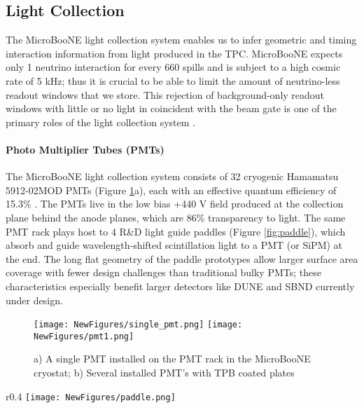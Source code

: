 \documentclass[12pt]{article}
\begin{document}
\subsection{Light Collection} \label{subsec:lightCollection}
\par The MicroBooNE light collection system enables us to infer geometric and timing interaction information from light produced in the TPC. MicroBooNE expects only 1 neutrino interaction for every 660 spills \cite{bib:first_nus} and is subject to a high cosmic rate of 5 kHz; thus it is crucial to be able to limit the amount of neutrino-less readout windows that we store. This rejection of background-only readout windows with little or no light in coincident with the beam gate is one of the primary roles of the light collection system \cite{bib:uboone_JINST}.

\paragraph{Photo Multiplier Tubes (PMTs)}

\par The MicroBooNE light collection system consists of 32 cryogenic Hamamatsu 5912-02MOD PMTs (Figure \ref{fig:pmt}a), each with an effective quantum efficiency of 15.3\% \cite{bib:ben_jones}. The PMTs live in the low bias +440 V field produced at the collection plane behind the anode planes, which are 86\% transparency to light.  The same PMT rack plays host to 4 R\&D light guide paddles (Figure \ref{fig:paddle}), which absorb and guide wavelength-shifted scintillation light to a PMT (or SiPM) at the end. The long flat geometry of the paddle prototypes allow larger surface area coverage with fewer design challenges than traditional bulky PMTs; these characteristics especially benefit larger detectors like DUNE and SBND currently under design.  

\begin{figure}[h!]
\centering
\texttt{[image: NewFigures/single\_pmt.png]}
\hspace{3 mm}
\texttt{[image: NewFigures/pmt1.png]}
\caption{ a) A single PMT installed on the PMT rack in the MicroBooNE cryostat; b) Several installed PMT's with TPB coated plates  } 
\label{fig:pmt}
\end{figure}

\begin{wrapfigure}{r}{0.4\textwidth}
\centering
\texttt{[image: NewFigures/paddle.png]}
\caption{One of the 4 lightguide prototypes in the MicroBooNE PMT rack}
\label{fig:paddle}
\end{wrapfigure}
\end{document}
